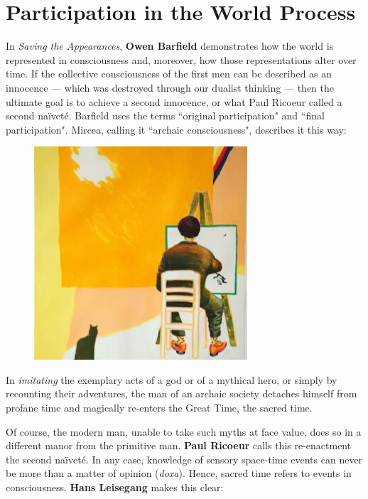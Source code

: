 \section{Participation in the World Process}


In \emph{Saving the Appearances}, \textbf{Owen Barfield} demonstrates how the world is represented in consciousness and, moreover, how those representations alter over time. If the collective consciousness of the first men can be described as an innocence — which was destroyed through our dualist thinking — then the ultimate goal is to achieve a second innocence, or what Paul Ricoeur called a second naïveté. Barfield uses the terms ``original participation" and ``final participation". Mircea, calling it ``archaic consciousness", describes it this way:

\begin{figure}
 \includegraphics[scale=.5]{a20210706ParticipationintheWorldProcess-img001.jpg} 
 \end{figure}

\begin{quotex}
In \emph{imitating} the exemplary acts of a god or of a mythical hero, or simply by recounting their adventures, the man of an archaic society detaches himself from profane time and magically re-enters the Great Time, the sacred time. 

\end{quotex}
Of course, the modern man, unable to take such myths at face value, does so in a different manor from the primitive man. \textbf{Paul Ricoeur} calls this re-enactment the second naïveté. In any case, knowledge of sensory space-time events can never be more than a matter of opinion (\emph{doxa}). Hence, sacred time refers to events in consciousness. \textbf{Hans Leisegang} makes this clear:

